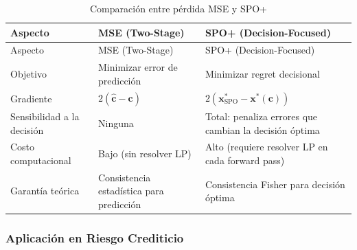 \documentclass[
  spanish,
  11pt,
  letterpaper,
]{scrbook}
\theoremstyle{plain}
\theoremstyle{remark}
\begin{document}
\begin{longtable}[]{@{}
  >{\raggedright\arraybackslash}p{}
  >{\raggedright\arraybackslash}p{}
  >{\raggedright\arraybackslash}p{}@{}}
\caption{Comparación entre pérdida MSE y
SPO+}\label{tbl-mse-vs-spo}\tabularnewline
\toprule\noalign{}
\begin{minipage}[b]{\linewidth}\raggedright
Aspecto
\end{minipage} & \begin{minipage}[b]{\linewidth}\raggedright
MSE (Two-Stage)
\end{minipage} & \begin{minipage}[b]{\linewidth}\raggedright
SPO+ (Decision-Focused)
\end{minipage} \\
\midrule\noalign{}
\endfirsthead
\toprule\noalign{}
\begin{minipage}[b]{\linewidth}\raggedright
Aspecto
\end{minipage} & \begin{minipage}[b]{\linewidth}\raggedright
MSE (Two-Stage)
\end{minipage} & \begin{minipage}[b]{\linewidth}\raggedright
SPO+ (Decision-Focused)
\end{minipage} \\
\midrule\noalign{}
\endhead
\bottomrule\noalign{}
\endlastfoot
Objetivo & Minimizar error de predicción & Minimizar regret
decisional \\
Gradiente & \(2(\hat{\mathbf{c}} - \mathbf{c})\) &
\(2(\mathbf{x}^*_{\text{SPO}} - \mathbf{x}^*(\mathbf{c}))\) \\
Sensibilidad a la decisión & Ninguna & Total: penaliza errores que
cambian la decisión óptima \\
Costo computacional & Bajo (sin resolver LP) & Alto (requiere resolver
LP en cada forward pass) \\
Garantía teórica & Consistencia estadística para predicción &
Consistencia Fisher para decisión óptima \\
\end{longtable}

\subsubsection{Aplicación en Riesgo
Crediticio}\label{aplicaciuxf3n-en-riesgo-crediticio}
\end{document}
